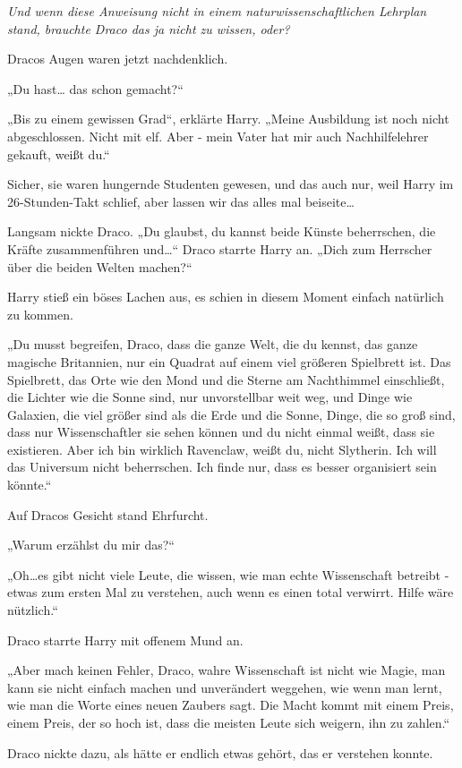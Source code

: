 {\emph{Und wenn diese Anweisung nicht in einem naturwissenschaftlichen Lehrplan stand, brauchte Draco das ja nicht zu wissen, oder?}

Dracos Augen waren jetzt nachdenklich.

„Du hast… das schon gemacht?“

„Bis zu einem gewissen Grad“, erklärte Harry. „Meine Ausbildung ist noch nicht abgeschlossen. Nicht mit elf. Aber - mein Vater hat mir auch Nachhilfelehrer gekauft, weißt du.“

Sicher, sie waren hungernde Studenten gewesen, und das auch nur, weil Harry im 26-Stunden-Takt schlief, aber lassen wir das alles mal beiseite…

Langsam nickte Draco. „Du glaubst, du kannst beide Künste beherrschen, die Kräfte zusammenführen und…“ Draco starrte Harry an. „Dich zum Herrscher über die beiden Welten machen?“

Harry stieß ein böses Lachen aus, es schien in diesem Moment einfach natürlich zu kommen.

„Du musst begreifen, Draco, dass die ganze Welt, die du kennst, das ganze magische Britannien, nur ein Quadrat auf einem viel größeren Spielbrett ist. Das Spielbrett, das Orte wie den Mond und die Sterne am Nachthimmel einschließt, die Lichter wie die Sonne sind, nur unvorstellbar weit weg, und Dinge wie Galaxien, die viel größer sind als die Erde und die Sonne, Dinge, die so groß sind, dass nur Wissenschaftler sie sehen können und du nicht einmal weißt, dass sie existieren. Aber ich bin wirklich Ravenclaw, weißt du, nicht Slytherin. Ich will das Universum nicht beherrschen. Ich finde nur, dass es besser organisiert sein könnte.“

Auf Dracos Gesicht stand Ehrfurcht.

„Warum erzählst du mir das?“

„Oh…es gibt nicht viele Leute, die wissen, wie man echte Wissenschaft betreibt - etwas zum ersten Mal zu verstehen, auch wenn es einen total verwirrt. Hilfe wäre nützlich.“

Draco starrte Harry mit offenem Mund an.

„Aber mach keinen Fehler, Draco, wahre Wissenschaft ist nicht wie Magie, man kann sie nicht einfach machen und unverändert weggehen, wie wenn man lernt, wie man die Worte eines neuen Zaubers sagt. Die Macht kommt mit einem Preis, einem Preis, der so hoch ist, dass die meisten Leute sich weigern, ihn zu zahlen.“

Draco nickte dazu, als hätte er endlich etwas gehört, das er verstehen konnte.

}
